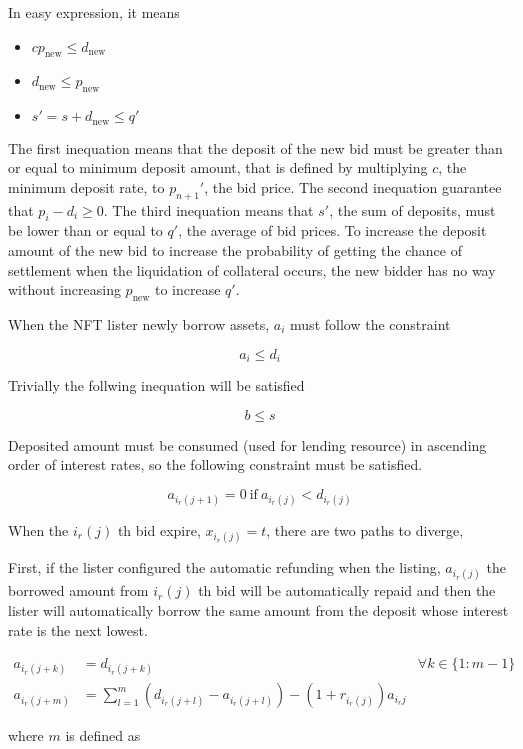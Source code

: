 \documentclass[dvipdfmx]{jsarticle}
\begin{document}
In easy expression, it means

\begin{itemize}
  \item $c p_{\text{new}} \le d_{\text{new}}$
  \item $d_{\text{new}} \le p_{\text{new}}$
  \item $s' = s + d_{\text{new}} \le q'$
\end{itemize}

The first inequation means that
the deposit of the new bid must be greater than or equal to minimum deposit amount,
that is defined by multiplying $c$, the minimum deposit rate, to $p_{n+1}'$, the bid price.
The second inequation guarantee that $p_i - d_i \ge 0$.
The third inequation means that $s'$, the sum of deposits, must be lower than or equal to $q'$, the average of bid prices.
To increase the deposit amount of the new bid
to increase the probability of getting the chance of settlement when the liquidation of collateral occurs,
the new bidder has no way without increasing $p_{\text{new}}$ to increase $q'$.

When the NFT lister newly borrow assets, $a_i$ must follow the constraint

$$
  a_i \le d_i
$$

Trivially the follwing inequation will be satisfied

$$
  b \le s
$$

Deposited amount must be consumed (used for lending resource) in ascending order of interest rates,
so the following constraint must be satisfied.

$$
  a_{i_r(j+1)} = 0 \ \text{if} \ a_{i_r(j)} < d_{i_r(j)}
$$

When the $i_r(j)$ th bid expire, $x_{i_r(j)} = t$, there are two paths to diverge,

First, if the lister configured the automatic refunding when the listing, $a_{i_r(j)}$ the borrowed amount from $i_r(j)$ th bid will be automatically repaid and then
the lister will automatically borrow the same amount from the deposit whose interest rate is the next lowest.

\begin{align}
  a_{i_r(j + k)} &= d_{i_r(j + k)} & \forall k \in \{1 : m-1\} \\
  a_{i_r(j + m)} &= \sum_{l=1}^m \left( d_{i_r(j+l)} - a_{i_r(j+l)} \right) - (1 + r_{i_r(j)}) a_{i_r{j}} &
\end{align}

where $m$ is defined as
\end{document}
